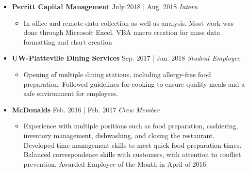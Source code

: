 \documentclass[11pt]{article}
\newcommand{\job}[3]{\vspace{1.5mm}
  \textbf{#1} \hfill #2 \linebreak \textit{#3}
}
\begin{document}
\begin{itemize}[leftmargin=*]
\begin{itemize}
	      \end{itemize}
	\item[]
	      \job
	      {Perritt Capital Management}
	      {July 2018 | Aug. 2018}
	      {Intern}
	      \begin{itemize}
	      	\item In-office and remote data collection as well as analysis. Most work was done through Microsoft Excel. VBA macro creation for mass data formatting and chart creation
	      \end{itemize}
	\item[]
	      \job
	      {UW-Platteville Dining Services}
	      {Sep. 2017 | Jan. 2018}
	      {Student Employee}
	      \begin{itemize}
	      	\item Opening of multiple dining stations, including allergy-free food preparation. Followed guidelines for cooking to ensure quality meals and a safe environment for employees.
	      \end{itemize}
	\item[]
	      \job
	      {McDonald\textquotesingle{}s}
	      {Feb. 2016 | Feb. 2017}
	      {Crew Member}
	      \begin{itemize}
	      	\item Experience with multiple positions such as food preparation, cashiering, inventory management, dishwashing, and closing the restaurant. Developed time management skills to meet quick food preparation times. Balanced correspondence skills with customers, with attention to conflict prevention. Awarded Employee of the Month in April of 2016.
	      \end{itemize}
\end{itemize}
\ 
\end{document}
